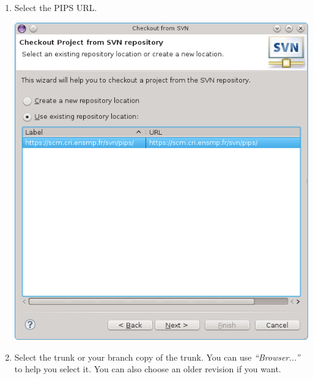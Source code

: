 \documentclass[a4paper]{article}
\begin{document}
\begin{enumerate}
\begin{enumerate}
\item Select the PIPS URL.
\begin{center}
\noindent
\includegraphics[scale=0.4]{eclipse/03-eclipseJUNO-newSVNProject2.png}
\end{center}

\item Select the trunk or your branch copy of the trunk. You can use \emph{``Browser...''} to help you select it. You can also choose an older revision if you want.


\end{enumerate}
\end{enumerate}
\end{document}
